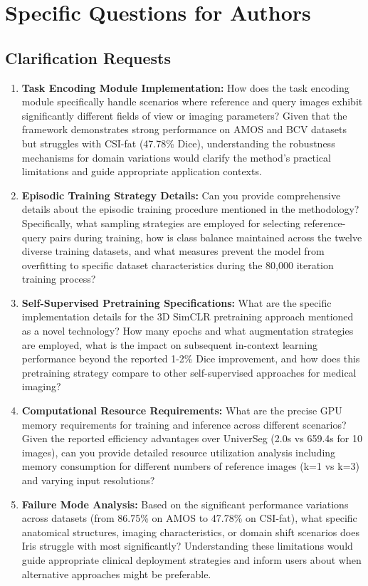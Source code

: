 \section{Specific Questions for Authors}
\label{sec:questions_authors}

\subsection{Clarification Requests}
\begin{enumerate}
    \item \textbf{Task Encoding Module Implementation:} How does the task encoding module specifically handle scenarios where reference and query images exhibit significantly different fields of view or imaging parameters? Given that the framework demonstrates strong performance on AMOS and BCV datasets but struggles with CSI-fat (47.78\% Dice), understanding the robustness mechanisms for domain variations would clarify the method's practical limitations and guide appropriate application contexts.
    
    \item \textbf{Episodic Training Strategy Details:} Can you provide comprehensive details about the episodic training procedure mentioned in the methodology? Specifically, what sampling strategies are employed for selecting reference-query pairs during training, how is class balance maintained across the twelve diverse training datasets, and what measures prevent the model from overfitting to specific dataset characteristics during the 80,000 iteration training process?
    
    \item \textbf{Self-Supervised Pretraining Specifications:} What are the specific implementation details for the 3D SimCLR pretraining approach mentioned as a novel technology? How many epochs and what augmentation strategies are employed, what is the impact on subsequent in-context learning performance beyond the reported 1-2\% Dice improvement, and how does this pretraining strategy compare to other self-supervised approaches for medical imaging?
    
    \item \textbf{Computational Resource Requirements:} What are the precise GPU memory requirements for training and inference across different scenarios? Given the reported efficiency advantages over UniverSeg (2.0s vs 659.4s for 10 images), can you provide detailed resource utilization analysis including memory consumption for different numbers of reference images (k=1 vs k=3) and varying input resolutions?
    
    \item \textbf{Failure Mode Analysis:} Based on the significant performance variations across datasets (from 86.75\% on AMOS to 47.78\% on CSI-fat), what specific anatomical structures, imaging characteristics, or domain shift scenarios does Iris struggle with most significantly? Understanding these limitations would guide appropriate clinical deployment strategies and inform users about when alternative approaches might be preferable.
\end{enumerate}

